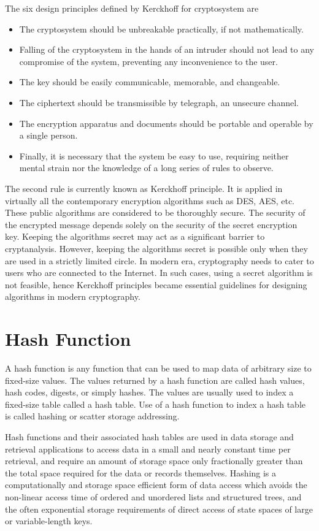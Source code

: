 \documentclass[british]{report}
\begin{document}
The six design principles defined by Kerckhoff for cryptosystem are
\textminus{}
\begin{itemize}
	\item The cryptosystem should be unbreakable practically, if not mathematically.
	\item Falling of the cryptosystem in the hands of an intruder should not
	      lead to any compromise of the system, preventing any inconvenience
	      to the user.
	\item The key should be easily communicable, memorable, and changeable.
	\item The ciphertext should be transmissible by telegraph, an unsecure channel.
	\item The encryption apparatus and documents should be portable and operable
	      by a single person.
	\item Finally, it is necessary that the system be easy to use, requiring
	      neither mental strain nor the knowledge of a long series of rules
	      to observe.
\end{itemize}
The second rule is currently known as Kerckhoff principle. It is applied
in virtually all the contemporary encryption algorithms such as DES,
AES, etc. These public algorithms are considered to be thoroughly
secure. The security of the encrypted message depends solely on the
security of the secret encryption key. Keeping the algorithms secret
may act as a significant barrier to cryptanalysis. However, keeping
the algorithms secret is possible only when they are used in a strictly
limited circle. In modern era, cryptography needs to cater to users
who are connected to the Internet. In such cases, using a secret algorithm
is not feasible, hence Kerckhoff principles became essential guidelines
for designing algorithms in modern cryptography.

\section{Hash Function}

A hash function is any function that can be used to map data of arbitrary
size to fixed-size values. The values returned by a hash function
are called hash values, hash codes, digests, or simply hashes. The
values are usually used to index a fixed-size table called a hash
table. Use of a hash function to index a hash table is called hashing
or scatter storage addressing.

Hash functions and their associated hash tables are used in data storage
and retrieval applications to access data in a small and nearly constant
time per retrieval, and require an amount of storage space only fractionally
greater than the total space required for the data or records themselves.
Hashing is a computationally and storage space efficient form of data
access which avoids the non-linear access time of ordered and unordered
lists and structured trees, and the often exponential storage requirements
of direct access of state spaces of large or variable-length keys.
\end{document}
